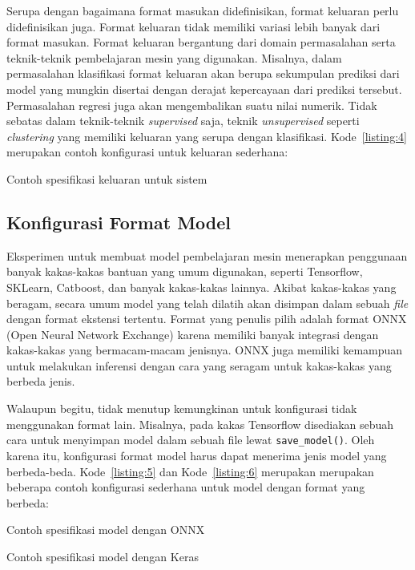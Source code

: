 Serupa dengan bagaimana format masukan didefinisikan, format keluaran perlu didefinisikan juga.
Format keluaran tidak memiliki variasi lebih banyak dari format masukan.
Format keluaran bergantung dari domain permasalahan serta teknik-teknik pembelajaran mesin yang digunakan.
Misalnya, dalam permasalahan klasifikasi format keluaran akan berupa sekumpulan prediksi dari model yang mungkin disertai dengan derajat kepercayaan dari prediksi tersebut.
Permasalahan regresi juga akan mengembalikan suatu nilai numerik.
Tidak sebatas dalam teknik-teknik \textit{supervised} saja, teknik \textit{unsupervised} seperti \textit{clustering} yang memiliki keluaran yang serupa dengan klasifikasi.
Kode~\ref{listing:4} merupakan contoh konfigurasi untuk keluaran sederhana:

\begin{code}
	\caption{Contoh spesifikasi keluaran untuk sistem}\label{listing:4}
\end{code}

\subsection{Konfigurasi Format Model}\label{section:03-model-format}

Eksperimen untuk membuat model pembelajaran mesin menerapkan penggunaan banyak kakas-kakas bantuan yang umum digunakan, seperti Tensorflow, SKLearn, Catboost, dan banyak kakas-kakas lainnya.
Akibat kakas-kakas yang beragam, secara umum model yang telah dilatih akan disimpan dalam sebuah \textit{file} dengan format ekstensi tertentu.
Format yang penulis pilih adalah format ONNX (Open Neural Network Exchange) karena memiliki banyak integrasi dengan kakas-kakas yang bermacam-macam jenisnya.
ONNX juga memiliki kemampuan untuk melakukan inferensi dengan cara yang seragam untuk kakas-kakas yang berbeda jenis.

Walaupun begitu, tidak menutup kemungkinan untuk konfigurasi tidak menggunakan format lain.
Misalnya, pada kakas Tensorflow disediakan sebuah cara untuk menyimpan model dalam sebuah file lewat \texttt{save_model()}.
Oleh karena itu, konfigurasi format model harus dapat menerima jenis model yang berbeda-beda.
Kode~\ref{listing:5} dan Kode~\ref{listing:6} merupakan merupakan beberapa contoh konfigurasi sederhana untuk model dengan format yang berbeda:

\begin{code}
	\caption{Contoh spesifikasi model dengan ONNX}\label{listing:5}
\end{code}
\begin{code}
	\caption{Contoh spesifikasi model dengan Keras}\label{listing:6}
\end{code}

